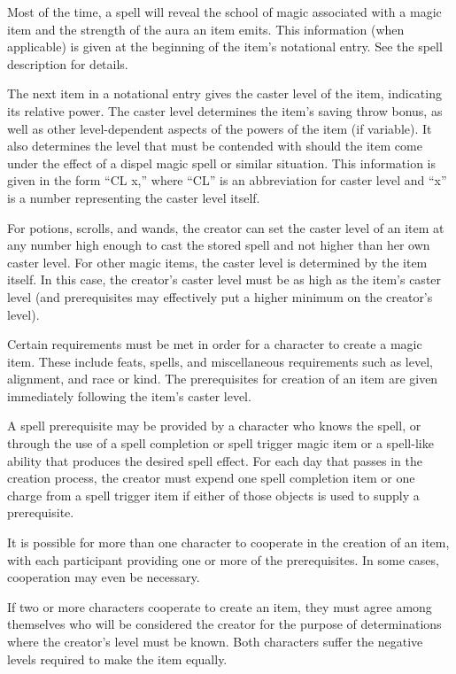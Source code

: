 \begin{itemize*}
 Most of the time, a  spell will reveal the school of magic associated with a magic item and the strength of the aura an item emits. This information (when applicable) is given at the beginning of the item's notational entry. See the  spell description for details.

 The next item in a notational entry gives the caster level of the item, indicating its relative power. The caster level determines the item's saving throw bonus, as well as other level-dependent aspects of the powers of the item (if variable). It also determines the level that must be contended with should the item come under the effect of a dispel magic spell or similar situation. This information is given in the form ``CL x,'' where ``CL'' is an abbreviation for caster level and ``x'' is a number representing the caster level itself.

For potions, scrolls, and wands, the creator can set the caster level of an item at any number high enough to cast the stored spell and not higher than her own caster level. For other magic items, the caster level is determined by the item itself. In this case, the creator's caster level must be as high as the item's caster level (and prerequisites may effectively put a higher minimum on the creator's level).

 Certain requirements must be met in order for a character to create a magic item. These include feats, spells, and miscellaneous requirements such as level, alignment, and race or kind. The prerequisites for creation of an item are given immediately following the item's caster level.

A spell prerequisite may be provided by a character who knows the spell, or through the use of a spell completion or spell trigger magic item or a spell-like ability that produces the desired spell effect. For each day that passes in the creation process, the creator must expend one spell completion item or one charge from a spell trigger item if either of those objects is used to supply a prerequisite.

It is possible for more than one character to cooperate in the creation of an item, with each participant providing one or more of the prerequisites. In some cases, cooperation may even be necessary.

If two or more characters cooperate to create an item, they must agree among themselves who will be considered the creator for the purpose of determinations where the creator's level must be known. Both characters suffer the negative levels required to make the item equally.


\end{itemize*}
